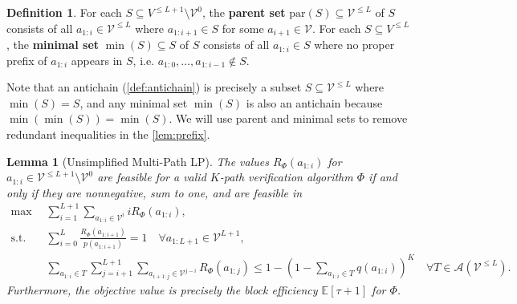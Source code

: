 \documentclass{article}
\theoremstyle{plain}
\newtheorem{lemma}[theorem]{Lemma}
\theoremstyle{definition}
\newtheorem{definition}[theorem]{Definition}
\theoremstyle{remark}
\newcommand{\V}{\mathcal{V}}
\newcommand{\pa}{\text{par}}
\begin{document}
\begin{definition}
    For each $S \subseteq V^{\leq L+1} \setminus \V^0$, the \textbf{parent set} $\pa(S) \subseteq \V^{\leq L}$ of $S$ consists of all $a_{1:i} \in \V^{\leq L}$ where $a_{1:i+1} \in S$ for some $a_{i+1} \in \V$. For each $S \subseteq V^{\leq L}$, the \textbf{minimal set} $\min(S) \subseteq S$ of $S$ consists of all $a_{1:i} \in S$ where no proper prefix of $a_{1:i}$ appears in $S$, i.e. $a_{1:0},\ldots,a_{1:i-1} \not \in S$.
\end{definition}

Note that an antichain (\cref{def:antichain}) is precisely a subset $S \subseteq \V^{\leq L}$ where $\min(S) = S$, and any minimal set $\min(S)$ is also an antichain because $\min(\min(S))=\min(S)$. We will use parent and minimal sets to remove redundant inequalities in the \cref{lem:prefix}.

\begin{lemma}[Unsimplified Multi-Path LP]
    The values $R_\Phi(a_{1:i})$ for $a_{1:i} \in \V^{\leq L+1}\setminus \V^0$ are feasible for a valid $K$-path verification algorithm $\Phi$ if and only if they are nonnegative, sum to one, and are feasible in
    \begin{align}
        \max & \sum_{i=1}^{L+1} \sum_{a_{1:i} \in \V^{i}} i R_\Phi(a_{1:i}),\\
        \text{s.t.}\quad & \sum_{i=0}^{L} \frac{R_\Phi(a_{1:i+1})}{p(a_{1:i+1})} = 1\quad \forall a_{1:L+1} \in \V^{L+1},\\
        & \sum_{a_{1:i} \in T} \sum_{j=i+1}^{L+1} \sum_{a_{i+1:j} \in \V^{j-i}} R_\Phi(a_{1:j})  \leq 1 - \left(1 - \sum_{a_{1:i} \in T} q(a_{1:i})\right)^K \quad \forall T \in \mathcal{A}(\V^{\leq L}).
    \end{align}
    Furthermore, the objective value is precisely the block efficiency $\mathbb{E}[\tau+1]$ for $\Phi$.
\end{lemma}
\end{document}
